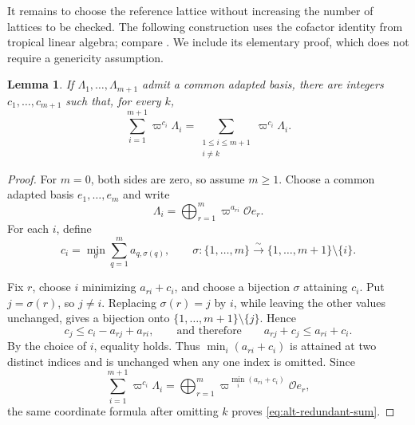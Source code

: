 \documentclass[12pt]{amsart}
\newtheorem{lem}[theorem]{Lemma}
\theoremstyle{definition}
\theoremstyle{remark}
\begin{document}
It remains to choose the reference lattice without increasing the
number of lattices to be checked. The following construction uses the
cofactor identity from tropical linear algebra; compare
\cite[Section~5]{RST}. We include its elementary proof, which does not require a genericity assumption.

\begin{lem}\label{lem:alt-redundant-sum}
If $\Lambda_1,\ldots,\Lambda_{m+1}$ admit a common adapted basis, there
are integers $c_1,\ldots,c_{m+1}$ such that, for every $k$,
\begin{equation}
\label{eq:alt-redundant-sum}
 \sum_{i=1}^{m+1}\varpi^{c_i}\Lambda_i
   =\sum_{\substack{1\leq i\leq m+1\\i\neq k}}
                       \varpi^{c_i}\Lambda_i.
\end{equation}
\end{lem}
\begin{proof}
For $m=0$, both sides are zero, so assume $m\geq1$. Choose a common adapted basis $e_1,\ldots,e_m$ and write
\[
\Lambda_i=\bigoplus_{r=1}^m
\varpi^{a_{ri}}\mathcal O e_r.
\]
For each $i$, define
\[
c_i=\min_{\sigma}\sum_{q=1}^m a_{q,\sigma(q)},
\qquad
\sigma:\{1,\ldots,m\}\xrightarrow{\sim}
\{1,\ldots,m+1\}\setminus\{i\}.
\]

Fix $r$, choose $i$ minimizing $a_{ri}+c_i$, and choose
a bijection $\sigma$ attaining $c_i$. Put $j=\sigma(r)$, so $j\neq i$. Replacing $\sigma(r)=j$ by $i$, while leaving the other values unchanged, gives a bijection onto
$\{1,\ldots,m+1\}\setminus\{j\}$.
Hence
\[
  c_j\leq c_i-a_{rj}+a_{ri},
  \qquad\text{and therefore}\qquad
  a_{rj}+c_j\leq a_{ri}+c_i.
\]
By the choice of $i$, equality holds. Thus $\min_i(a_{ri}+c_i)$ is attained at two distinct indices and is unchanged when any one index is omitted.
Since
\[
  \sum_{i=1}^{m+1}\varpi^{c_i}\Lambda_i
  =\bigoplus_{r=1}^m
  \varpi^{\min_i(a_{ri}+c_i)}\mathcal O e_r,
\]
the same coordinate formula after omitting $k$ proves
\eqref{eq:alt-redundant-sum}.

\end{proof}
\end{document}
